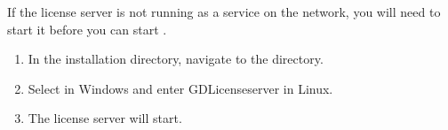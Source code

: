 If the license server  is not running as a service on the network, you will need to start it before you can start \gd{}. 

\begin{enumerate}
\item In the \gd{} installation directory, navigate to the  directory.
\item Select  in Windows and enter GDLicenseserver in Linux. 
\item The license server will start. 
\end{enumerate}
